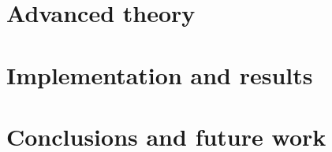 \documentclass[twoside,english]{uiofysmaster}
\begin{document}



\part{Advanced theory}




\part{Implementation and results}





\part{Conclusions and future work}


\begin{appendices}
\appendixpage
\noappendicestocpagenum
\addappheadtotoc

\end{appendices}

\nocite{ISO80000}

\printbibliography
\end{document}
